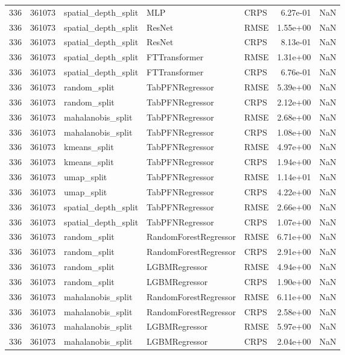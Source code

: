 \begin{tabular}{rrlllrr}
336 & 361073 & spatial\_depth\_split & MLP & CRPS & 6.27e-01 & NaN \\
336 & 361073 & spatial\_depth\_split & ResNet & RMSE & 1.55e+00 & NaN \\
336 & 361073 & spatial\_depth\_split & ResNet & CRPS & 8.13e-01 & NaN \\
336 & 361073 & spatial\_depth\_split & FTTransformer & RMSE & 1.31e+00 & NaN \\
336 & 361073 & spatial\_depth\_split & FTTransformer & CRPS & 6.76e-01 & NaN \\
336 & 361073 & random\_split & TabPFNRegressor & RMSE & 5.39e+00 & NaN \\
336 & 361073 & random\_split & TabPFNRegressor & CRPS & 2.12e+00 & NaN \\
336 & 361073 & mahalanobis\_split & TabPFNRegressor & RMSE & 2.68e+00 & NaN \\
336 & 361073 & mahalanobis\_split & TabPFNRegressor & CRPS & 1.08e+00 & NaN \\
336 & 361073 & kmeans\_split & TabPFNRegressor & RMSE & 4.97e+00 & NaN \\
336 & 361073 & kmeans\_split & TabPFNRegressor & CRPS & 1.94e+00 & NaN \\
336 & 361073 & umap\_split & TabPFNRegressor & RMSE & 1.14e+01 & NaN \\
336 & 361073 & umap\_split & TabPFNRegressor & CRPS & 4.22e+00 & NaN \\
336 & 361073 & spatial\_depth\_split & TabPFNRegressor & RMSE & 2.66e+00 & NaN \\
336 & 361073 & spatial\_depth\_split & TabPFNRegressor & CRPS & 1.07e+00 & NaN \\
336 & 361073 & random\_split & RandomForestRegressor & RMSE & 6.71e+00 & NaN \\
336 & 361073 & random\_split & RandomForestRegressor & CRPS & 2.91e+00 & NaN \\
336 & 361073 & random\_split & LGBMRegressor & RMSE & 4.94e+00 & NaN \\
336 & 361073 & random\_split & LGBMRegressor & CRPS & 1.90e+00 & NaN \\
336 & 361073 & mahalanobis\_split & RandomForestRegressor & RMSE & 6.11e+00 & NaN \\
336 & 361073 & mahalanobis\_split & RandomForestRegressor & CRPS & 2.58e+00 & NaN \\
336 & 361073 & mahalanobis\_split & LGBMRegressor & RMSE & 5.97e+00 & NaN \\
336 & 361073 & mahalanobis\_split & LGBMRegressor & CRPS & 2.04e+00 & NaN \\

\end{tabular}
